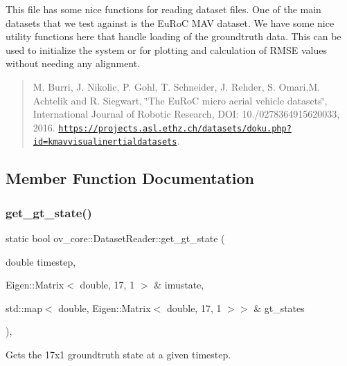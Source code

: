 This file has some nice functions for reading dataset files. One of the main datasets that we test against is the Eu\+RoC M\+AV dataset. We have some nice utility functions here that handle loading of the groundtruth data. This can be used to initialize the system or for plotting and calculation of R\+M\+SE values without needing any alignment.

\begin{quote}
M. Burri, J. Nikolic, P. Gohl, T. Schneider, J. Rehder, S. Omari,M. Achtelik and R. Siegwart, \char`\"{}\+The Eu\+Ro\+C micro aerial vehicle datasets\char`\"{}, International Journal of Robotic Research, D\+OI\+: 10./0278364915620033, 2016. \href{https://projects.asl.ethz.ch/datasets/doku.php?id=kmavvisualinertialdatasets}{\tt https\+://projects.\+asl.\+ethz.\+ch/datasets/doku.\+php?id=kmavvisualinertialdatasets}.\end{quote}


\subsection{Member Function Documentation}
\mbox{\label{classov__core_1_1DatasetReader_af7827150c03a1871d5211764699ef0eb}} 
\subsubsection{\texorpdfstring{get\+\_\+gt\+\_\+state()}{get\_gt\_state()}}
{\footnotesize\ttfamily static bool ov\+\_\+core\+::\+Dataset\+Reader\+::get\+\_\+gt\+\_\+state (\begin{DoxyParamCaption}\item[{double}]{timestep,  }\item[{Eigen\+::\+Matrix$<$ double, 17, 1 $>$ \&}]{imustate,  }\item[{std\+::map$<$ double, Eigen\+::\+Matrix$<$ double, 17, 1 $>$$>$ \&}]{gt\+\_\+states }\end{DoxyParamCaption})\hspace{0.3cm}{\ttfamily [inline]}, {\ttfamily [static]}}



Gets the 17x1 groundtruth state at a given timestep. 


